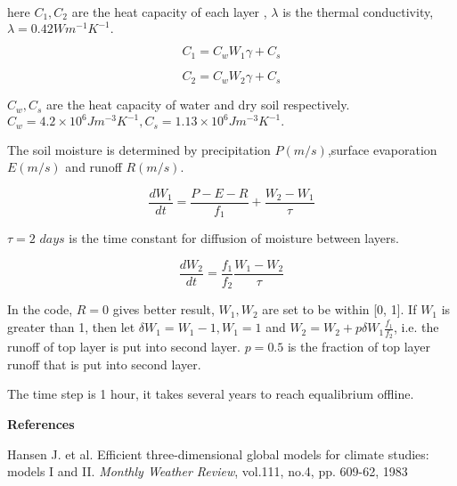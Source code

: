 here $C_{1},C_{2}$ are the heat capacity of each layer , $\lambda $ is the
thermal conductivity, $\lambda =0.42Wm^{-1}K^{-1}.$

\begin{center}
\bigskip 
\begin{equation}
C_{1}=C_{w}W_{1}\gamma +C_{s}
\end{equation}

\begin{equation}
C_{2}=C_{w}W_{2}\gamma +C_{s}
\end{equation}
\end{center}

$C_{w},C_{s}$ are the heat capacity of water and dry soil respectively. $%
C_{w}=4.2\times 10^{6}Jm^{-3}K^{-1},C_{s}=1.13\times 10^{6}Jm^{-3}K^{-1}.$

\bigskip

The soil moisture is determined by precipitation $P(m/s)$,surface
evaporation $E(m/s)$ and runoff $R(m/s).$

\begin{equation}
\frac{dW_{1}}{dt}=\frac{P-E-R}{f_{1}}+\frac{W_{2}-W_{1}}{\tau }
\end{equation}

$\tau =2$ $days$ is the time constant for diffusion of moisture between
layers.

\begin{equation}
\frac{dW_{2}}{dt}=\frac{f_{1}}{f_{2}}\frac{W_{1}-W_{2}}{\tau }
\end{equation}

In the code, $R=0$ gives better result, $W_{1},W_{2}$ are set to be within
[0, 1]. If $W_{1}$ is greater than 1, then let $\delta W_{1}=W_{1}-1,W_{1}=1$
and $W_{2}=W_{2}+p\delta W_{1}\frac{f_{1}}{f_{2}}$, i.e. the runoff of top
layer is put into second layer. $p=0.5$ is the fraction of top layer runoff
that is put into second layer.

The time step is 1 hour, it takes several years to reach equalibrium offline.

\begin{center}
\bigskip
\end{center}

\textbf{References}

Hansen J. et al. Efficient three-dimensional global models for climate
studies: models I and II. \emph{Monthly Weather Review}, vol.111, no.4, pp.
609-62, 1983

% 
